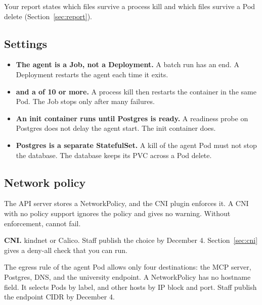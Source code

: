 \documentclass[9pt,letterpaper]{article}
\begin{document}
Your report states which files survive a process kill and which files survive a
Pod delete (Section~\ref{sec:report}).

\subsection{Settings}\label{sec:settings}

\begin{itemize}
\item \textbf{The agent is a Job, not a Deployment.} A batch run has an end. A
  Deployment restarts the agent each time it exits.
\item \textbf{ and a  of 10
  or more.} A process kill then restarts the container in the same Pod. The Job
  stops only after many failures.
\item \textbf{An init container runs  until Postgres is ready.}
  A readiness probe on Postgres does not delay the agent start. The init
  container does.
\item \textbf{Postgres is a separate StatefulSet.} A kill of the agent Pod must
  not stop the database. The database keeps its PVC across a Pod delete.
\end{itemize}

\subsection{Network policy}\label{sec:netpol}

The API server stores a NetworkPolicy, and the CNI plugin enforces it. A CNI with
no policy support ignores the policy and gives no warning. Without enforcement,
 cannot fail.

\textbf{CNI.} kindnet or Calico. Staff publish the choice by December 4.
Section~\ref{sec:cni} gives a deny-all check that you can run.

The egress rule of the agent Pod allows only four destinations: the MCP server,
Postgres, DNS, and the university endpoint. A NetworkPolicy has no hostname
field. It selects Pods by label, and other hosts by IP block and port.
Staff publish the endpoint CIDR by December 4.
\end{document}
